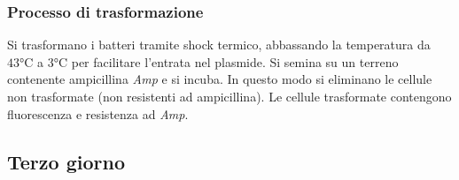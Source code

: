 		\subsubsection{Processo di trasformazione}
		Si trasformano i batteri tramite shock termico, abbassando la temperatura da $43\si{\celsius}$ a $3\si{\celsius}$ per facilitare l'entrata nel plasmide.
		Si semina su un terreno contenente ampicillina \emph{Amp} e si incuba.
		In questo modo si eliminano le cellule non trasformate (non resistenti ad ampicillina).
		Le cellule trasformate contengono fluorescenza e resistenza ad \emph{Amp}.

	\subsection{Terzo giorno}

